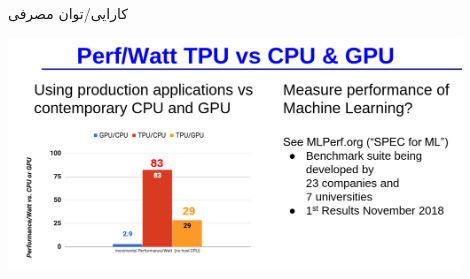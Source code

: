 \begin{frame}{کارایی/توان مصرفی}
\begin{center}
\includegraphics[width=0.9\textwidth, height=0.8\textheight]{docs/images/tpu-2}
\end{center}
\end{frame}
